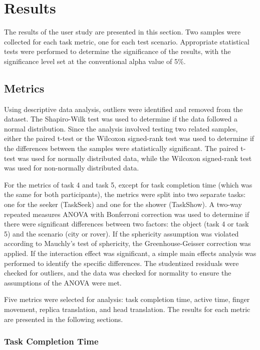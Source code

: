 \section{Results}

    The results of the user study are presented in this section. Two samples were collected for each task metric, one for each test scenario. Appropriate statistical tests were performed to determine the significance of the results, with the significance level set at the conventional alpha value of 5\%.

    \subsection{Metrics}

        Using descriptive data analysis, outliers were identified and removed from the dataset. The Shapiro-Wilk test \cite{shapiroAnalysisVarianceTest1965} was used to determine if the data followed a normal distribution. Since the analysis involved testing two related samples, either the paired t-test or the Wilcoxon signed-rank test \cite{wilcoxonIndividualComparisonsRanking1945}was used to determine if the differences between the samples were statistically significant. The paired t-test was used for normally distributed data, while the Wilcoxon signed-rank test was used for non-normally distributed data.

        For the metrics of task 4 and task 5, except for task completion time (which was the same for both participants), the metrics were split into two separate tasks: one for the seeker (TaskSeek) and one for the shower (TaskShow). A two-way repeated measures ANOVA with Bonferroni correction was used to determine if there were significant differences between two factors: the object (task 4 or task 5) and the scenario (city or rover). If the sphericity assumption was violated according to Mauchly's test of sphericity, the Greenhouse-Geisser correction was applied. If the interaction effect was significant, a simple main effects analysis was performed to identify the specific differences. The studentized residuals were checked for outliers, and the data was checked for normality to ensure the assumptions of the ANOVA were met.

        Five metrics were selected for analysis: task completion time, active time, finger movement, replica translation, and head translation. The results for each metric are presented in the following sections.

        \subsubsection{Task Completion Time}

